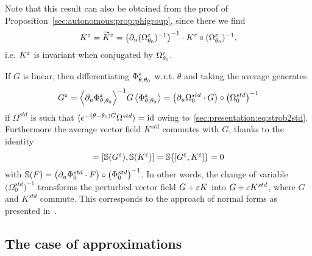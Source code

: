 Note that this result can also be obtained from the proof of
Proposition~\ref{sec:autonomous:prop:phigroup}, since there we find 
\begin{equation*}
  K^\varepsilon = \widetilde{K}^\varepsilon = \left(\partial_u
    (\Omega^\varepsilon_{\theta_0})^{-1}\right)^{-1} \cdot K^\varepsilon \circ
    (\Omega^\varepsilon_{\theta_0})^{-1} ,
\end{equation*}
i.e. $K^\varepsilon$ is invariant when conjugated by $\Omega^\varepsilon_{\theta_0}$.


\begin{remark} \label{sec:autonomous:rmk:std_link} If $G$ is linear, then
  differentiating $\Phi^\varepsilon _{\theta, \theta_0}$ w.r.t. $\theta$ and
  taking the average generates
  \begin{equation*}
    G^\varepsilon 
    = \Big \langle \partial_u \Phi^\varepsilon_{\theta, \theta_0} \Big \rangle^{-1} G \, 
      \big \langle \Phi^\varepsilon _{\theta, \theta_0} \big \rangle 
    = \big( \partial_u \Omega_0^{std} \cdot G \big) 
      \circ \big( \Omega_0^{std} \big)^{-1}
  \end{equation*}
  if $\Omega^{std}$ is such that $\langle e^{-(\theta-\theta_0) G}
  \Omega^{std} \rangle = \operatorname{id}$ owing to~\eqref{sec:presentation:eq:strob2std}.
  Furthermore the average vector field $K^{std}$ commutes with $G$, thanks
  to the identity
  \begin{equation*}
    [G,K^{std}] 
    = \left[ \mathbb S (G^\eps) , \mathbb S (K^\eps) \right]
    = \mathbb S \big( [G^\eps , K^\eps] \big)
    = 0
  \end{equation*}
  with $\mathbb S (F) = \big( \partial_u \Phi_0^{std} \cdot F \big) \circ
  \big( \Phi_0^{std} \big)^{-1}$. In other words, the change of variable
  $\big( \Omega^{std}_0 \big)^{-1}$ transforms the perturbed vector
  field $G + \varepsilon K$ into $G + \varepsilon K^{std}$, where $G$ and $K^{std}$
  commute. This corresponds to the approach of normal forms as presented
  in~\cite[Chap.~IX]{sanders.2007.averaging}.
\end{remark}



\subsection{The case of approximations}

